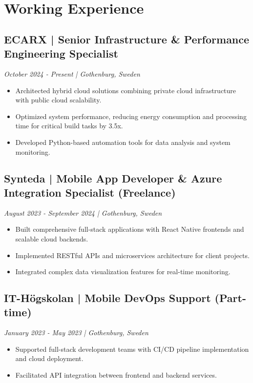 \documentclass[11pt,a4paper]{article}
\begin{document}
\section*{Working Experience}
\subsection*{ECARX | Senior Infrastructure & Performance Engineering Specialist}
\textit{October 2024 - Present | Gothenburg, Sweden}
\begin{itemize}[noitemsep]
\item Architected hybrid cloud solutions combining private cloud infrastructure with public cloud scalability.
\item Optimized system performance, reducing energy consumption and processing time for critical build tasks by 3.5x.
\item Developed Python-based automation tools for data analysis and system monitoring.
\end{itemize}

\subsection*{Synteda | Mobile App Developer \& Azure Integration Specialist (Freelance)}
\textit{August 2023 - September 2024 | Gothenburg, Sweden}
\begin{itemize}[noitemsep]
\item Built comprehensive full-stack applications with React Native frontends and scalable cloud backends.
\item Implemented RESTful APIs and microservices architecture for client projects.
\item Integrated complex data visualization features for real-time monitoring.
\end{itemize}

\subsection*{IT-Högskolan | Mobile DevOps Support (Part-time)}
\textit{January 2023 - May 2023 | Gothenburg, Sweden}
\begin{itemize}[noitemsep]
\item Supported full-stack development teams with CI/CD pipeline implementation and cloud deployment.
\item Facilitated API integration between frontend and backend services.
\end{itemize}
\end{document}
